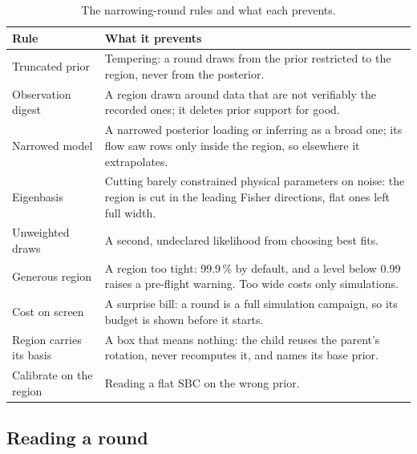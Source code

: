 \documentclass[10pt,a4paper]{article}
\begin{document}
\begin{table}[ht]
\centering
\caption{The narrowing-round rules and what each prevents.}\label{tab:rules}
\small
\begin{tabularx}{\textwidth}{@{}L{3.6cm} Y@{}}
\toprule
Rule & What it prevents \\
\midrule
Truncated prior & Tempering: a round draws from the prior restricted to the region, never from the posterior. \\
Observation digest & A region drawn around data that are not verifiably the recorded ones; it deletes prior support for good. \\
Narrowed model & A narrowed posterior loading or inferring as a broad one; its flow saw rows only inside the region, so elsewhere
  it extrapolates. \\
Eigenbasis & Cutting barely constrained physical parameters on noise: the region is cut in the leading Fisher directions, flat
  ones left full width. \\
Unweighted draws & A second, undeclared likelihood from choosing best fits. \\
Generous region & A region too tight: 99.9\,\% by default, and a level below 0.99 raises a pre-flight warning. Too wide costs
  only simulations. \\
Cost on screen & A surprise bill: a round is a full simulation campaign, so its budget is shown before it starts. \\
Region carries its basis & A box that means nothing: the child reuses the parent's rotation, never recomputes it, and names its
  base prior. \\
Calibrate on the region & Reading a flat SBC on the wrong prior. \\
\bottomrule
\end{tabularx}
\end{table}

\subsection{Reading a round}
\end{document}
